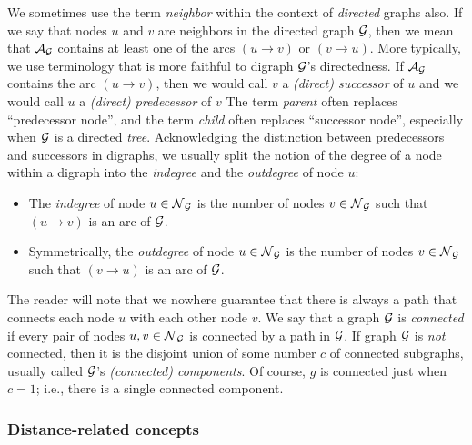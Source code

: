 \medskip

We sometimes use the term {\it neighbor} within the context of {\em
  directed} graphs also.  If we say that nodes $u$ and $v$ are
neighbors in the directed graph $\mbox{$\cal G$}$,
then we mean that $\mbox{$\cal A$}_{\mbox{{\scriptsize $\cal G$}}}$ contains at least one of the arcs $(u
  \rightarrow v)$ or $(v \rightarrow u)$.  More typically, we use
  terminology that is more faithful to digraph $\mbox{$\cal G$}$'s directedness.
If $\mbox{$\cal A$}_{\mbox{{\scriptsize $\cal G$}}}$ contains the arc $(u \rightarrow v)$, then we would call
  $v$ a {\it (direct) successor} of $u$
and we would call $u$ a {\it (direct) predecessor} of $v$
The term {\it parent} often replaces ``predecessor node'', and the
term {\it child} often replaces ``successor node'', especially when
$\mbox{$\cal G$}$ is a directed {\em tree}.  Acknowledging the distinction between
predecessors and successors in digraphs, we usually split the notion
of the degree of a node within a digraph into the {\it indegree} and
the {\it outdegree} of node $u$:
\begin{itemize}
\item
The {\it indegree} of node $u \in \mbox{$\cal N$}_{\mbox{{\scriptsize $\cal G$}}}$
is the number of nodes $v \in \mbox{$\cal N$}_{\mbox{{\scriptsize $\cal G$}}}$ such that $(u \rightarrow v)$
is an arc of $\mbox{$\cal G$}$.
\item
Symmetrically, the {\it outdegree} of node $u \in \mbox{$\cal N$}_{\mbox{{\scriptsize $\cal G$}}}$
is the number of nodes $v \in \mbox{$\cal N$}_{\mbox{{\scriptsize $\cal G$}}}$ such that $(v \rightarrow u)$
is an arc of $\mbox{$\cal G$}$.
\end{itemize}

\smallskip

The reader will note that we nowhere guarantee that there is always a
path that connects each node $u$ with each other node $v$.  We say
that a graph $\mbox{$\cal G$}$ is {\it connected}  if every
pair of nodes $u, v \in \mbox{$\cal N$}_{\mbox{{\scriptsize $\cal G$}}}$ is connected by a path in $\mbox{$\cal G$}$.  If
graph $\mbox{$\cal G$}$ is {\em not} connected, then it is the disjoint union of
some number $c$ of connected subgraphs, usually called $\mbox{$\cal G$}$'s {\it
  (connected) components}.   Of
course, $g$ is connected just when $c=1$; i.e., there is a single
connected component.

\subsubsection{Distance-related concepts}

